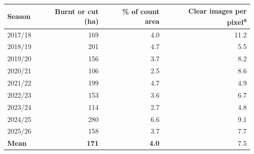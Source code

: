 \begin{tabular}{lrrr}
\toprule
Season & Burnt or cut (ha) & \% of count area & Clear images per pixel\textsuperscript{a} \\
\midrule
2017/18 & 169 & 4.0 & 11.2 \\
2018/19 & 201 & 4.7 & 5.5 \\
2019/20 & 156 & 3.7 & 8.2 \\
2020/21 & 106 & 2.5 & 8.6 \\
2021/22 & 199 & 4.7 & 4.9 \\
2022/23 & 153 & 3.6 & 6.7 \\
2023/24 & 114 & 2.7 & 4.8 \\
2024/25 & 280 & 6.6 & 9.1 \\
2025/26 & 158 & 3.7 & 7.7 \\
\midrule
\textbf{Mean} & \textbf{171} & \textbf{4.0} & 7.5 \\
\bottomrule
\end{tabular}

